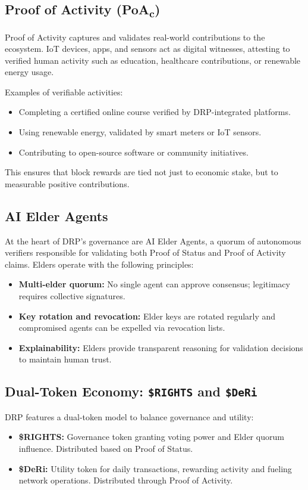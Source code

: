 \documentclass[11pt,a4paper]{article}
\begin{document}
\subsection{Proof of Activity (PoA\textsubscript{c})}
Proof of Activity captures and validates real-world contributions to the ecosystem. IoT devices, apps, and sensors act as digital witnesses, attesting to verified human activity such as education, healthcare contributions, or renewable energy usage.

Examples of verifiable activities:
\begin{itemize}
    \item Completing a certified online course verified by DRP-integrated platforms.
    \item Using renewable energy, validated by smart meters or IoT sensors.
    \item Contributing to open-source software or community initiatives.
\end{itemize}

This ensures that block rewards are tied not just to economic stake, but to measurable positive contributions.

\subsection{AI Elder Agents}
At the heart of DRP’s governance are AI Elder Agents, a quorum of autonomous verifiers responsible for validating both Proof of Status and Proof of Activity claims. Elders operate with the following principles:
\begin{itemize}
    \item \textbf{Multi-elder quorum:} No single agent can approve consensus; legitimacy requires collective signatures.
    \item \textbf{Key rotation and revocation:} Elder keys are rotated regularly and compromised agents can be expelled via revocation lists.
    \item \textbf{Explainability:} Elders provide transparent reasoning for validation decisions to maintain human trust.
\end{itemize}

\subsection{Dual-Token Economy: \texttt{\$RIGHTS} and \texttt{\$DeRi}}
DRP features a dual-token model to balance governance and utility:
\begin{itemize}
    \item \textbf{\$RIGHTS:} Governance token granting voting power and Elder quorum influence. Distributed based on Proof of Status.
    \item \textbf{\$DeRi:} Utility token for daily transactions, rewarding activity and fueling network operations. Distributed through Proof of Activity.
\end{itemize}
\end{document}
